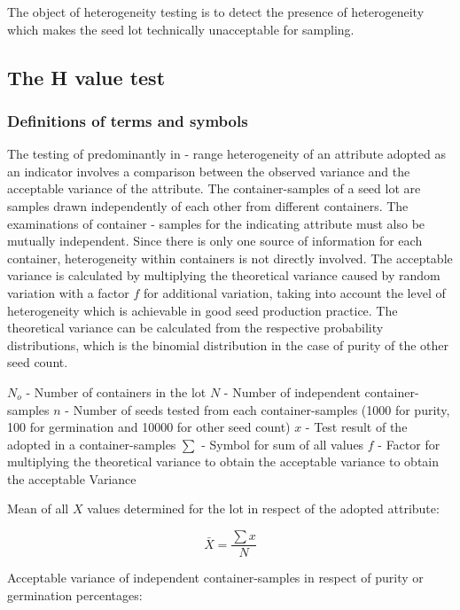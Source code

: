 \documentclass[
]{book}
\begin{document}
The object of heterogeneity testing is to detect the presence of heterogeneity which makes the seed lot technically unacceptable for sampling.

\hypertarget{the-h-value-test}{%
\subsection{The H value test}\label{the-h-value-test}}

\hypertarget{definitions-of-terms-and-symbols}{%
\subsubsection{Definitions of terms and symbols}\label{definitions-of-terms-and-symbols}}

The testing of predominantly in - range heterogeneity of an attribute adopted as an indicator involves a comparison between the observed variance and the acceptable variance of the attribute. The container-samples of a seed lot are samples drawn independently of each other from different containers. The examinations of container - samples for the indicating attribute must also be mutually independent. Since there is only one source of information for each container, heterogeneity within containers is not directly involved. The acceptable variance is calculated by multiplying the theoretical variance caused by random variation with a factor \(f\) for additional variation, taking into account the level of heterogeneity which is achievable in good seed production practice. The theoretical variance can be calculated from the respective probability distributions, which is the binomial distribution in the case of purity of the other seed count.

\(N_o\) - Number of containers in the lot
\(N\) - Number of independent container-samples
\(n\) - Number of seeds tested from each container-samples (1000 for purity, 100 for germination and 10000 for other seed count)
\(x\) - Test result of the adopted in a container-samples
\(\sum\) - Symbol for sum of all values
\(f\) - Factor for multiplying the theoretical variance to obtain the acceptable variance to obtain the acceptable Variance

Mean of all \(X\) values determined for the lot in respect of the adopted attribute:

\[
\bar{X} = \frac{\sum{x}}{N}
\]

Acceptable variance of independent container-samples in respect of purity or germination percentages:
\end{document}
